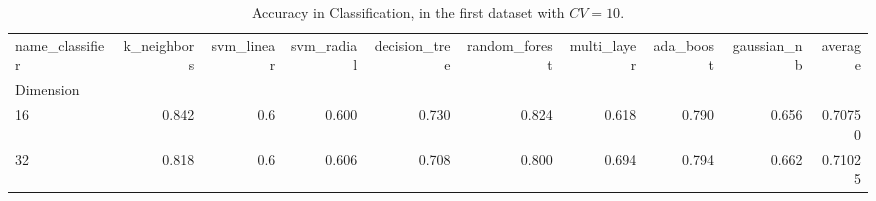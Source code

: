 \begin{table}
\centering
\caption{Accuracy in Classification, in the first dataset with $CV=10$.}
\label{metrics_boon_cv_10}
\begin{tabular}{lrrrrrrrrr}
\toprule
name\_classifier &  k\_neighbors &  svm\_linear &  svm\_radial &  decision\_tree &  random\_forest &  multi\_layer &  ada\_boost &  gaussian\_nb &  average \\
Dimension &              &             &             &                &                &              &            &              &          \\
\midrule
16        &        0.842 &         0.6 &       0.600 &          0.730 &          0.824 &        0.618 &      0.790 &        0.656 &  0.70750 \\
32        &        0.818 &         0.6 &       0.606 &          0.708 &          0.800 &        0.694 &      0.794 &        0.662 &  0.71025 \\
\bottomrule
\end{tabular}
\end{table}
